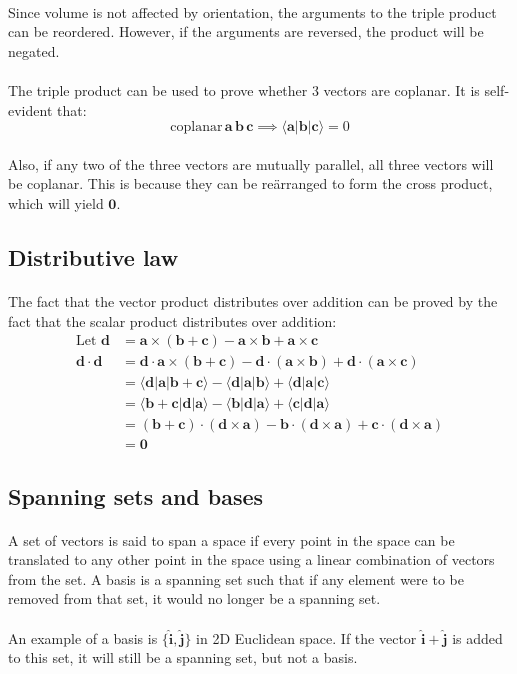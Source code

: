 \documentclass[11pt]{article}
\newcommand*\cd{\cdot}
\newcommand*\prg{\paragraph}
\begin{document}
\prg{}Since volume is not affected by orientation, the arguments to the triple product can be reordered. However, if the arguments are reversed, the product will be negated.

\prg{}The triple product can be used to prove whether 3 vectors are coplanar. It is self-evident that:
\[
\mathrm{coplanar}\,\mathbf a\,\mathbf b\,\mathbf c\implies\langle\mathbf a|\mathbf b|\mathbf c\rangle=0
\]
\prg{}Also, if any two of the three vectors are mutually parallel, all three vectors will be coplanar. This is because they can be re\"arranged to form the cross product, which will yield $\mathbf 0$.

\subsection{Distributive law}
\prg{}The fact that the vector product distributes over addition can be proved by the fact that the scalar product distributes over addition:
\[
\begin{aligned}
\textrm{Let }\mathbf d&=\mathbf a\times(\mathbf b+\mathbf c)-\mathbf a\times \mathbf b+\mathbf a\times \mathbf c\\
\mathbf d\cd \mathbf d&=\mathbf d\cd \mathbf a\times(\mathbf b+\mathbf c)-\mathbf d\cd(\mathbf a\times \mathbf b)+\mathbf d\cd(\mathbf a\times \mathbf c)\\
&=\langle \mathbf d|\mathbf a|\mathbf b+\mathbf c\rangle-\langle \mathbf d|\mathbf a|\mathbf b\rangle+\langle \mathbf d|\mathbf a|\mathbf c\rangle\\
&=\langle \mathbf b+\mathbf c|\mathbf d|\mathbf a\rangle-\langle \mathbf b|\mathbf d|\mathbf a\rangle+\langle \mathbf c|\mathbf d|\mathbf a\rangle\\
&=(\mathbf b+\mathbf c)\cd(\mathbf d\times \mathbf a)-\mathbf b\cd(\mathbf d\times \mathbf a)+\mathbf c\cd(\mathbf d\times \mathbf a)\\
&=\mathbf 0
\end{aligned}
\]

\subsection{Spanning sets and bases}
\prg{}A set of vectors is said to span a space if every point in the space can be translated to any other point in the space using a linear combination of vectors from the set. A basis is a spanning set such that if any element were to be removed from that set, it would no longer be a spanning set.

\prg{}An example of a basis is $\{\mathbf{\hat i},\mathbf{\hat j}\}$ in 2D Euclidean space. If the vector $\mathbf{\hat i}+\mathbf{\hat j}$ is added to this set, it will still be a spanning set, but not a basis.
\end{document}
